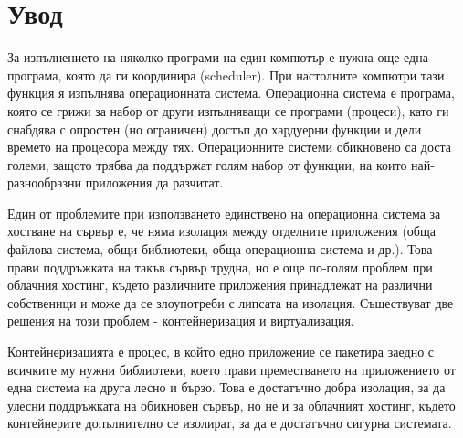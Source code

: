\chapter*{Увод}


За изпълнението на няколко програми на един компютър е нужна още една програма, която да ги координира (scheduler). При настолните компютри тази функция я изпълнява операционната система.
Операционна система е програма, която се грижи за набор от други изпълняващи се програми (процеси), като ги снабдява с опростен (но ограничен) достъп до хардуерни функции и дели времето на процесора между тях. Операционните системи обикновено са доста големи, защото трябва да поддържат голям набор от функции, на които най-разнообразни приложения да разчитат.

Един от проблемите при използването единствено на операционна система за хостване на сървър е, че няма изолация между отделните приложения (обща файлова система, общи библиотеки, обща операционна система и др.). Това прави поддръжката на такъв сървър трудна, но е още по-голям проблем при облачния хостинг, където различните приложения принадлежат на различни собственици и може да се злоупотреби с липсата на изолация.
Съществуват две решения на този проблем - контейнеризация и виртуализация.

Контейнеризацията е процес, в който едно приложение се пакетира заедно с всичките му нужни библиотеки, което прави преместването на приложението от една система на друга лесно и бързо. Това е достатъчно добра изолация, за да улесни поддръжката на обикновен сървър, но не и за облачният хостинг, където контейнерите допълнително се изолират, за да е достатъчно сигурна системата.


